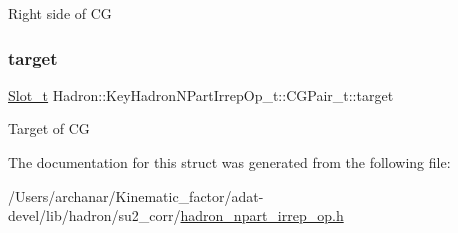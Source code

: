 Right side of CG \mbox{\label{structHadron_1_1KeyHadronNPartIrrepOp__t_1_1CGPair__t_aeb67dd901fec46892d25ddf2237eaa7d}} 
\subsubsection{\texorpdfstring{target}{target}}
{\footnotesize\ttfamily \mbox{\hyperlink{structHadron_1_1KeyHadronNPartIrrepOp__t_1_1CGPair__t_1_1Slot__t}{Slot\+\_\+t}} Hadron\+::\+Key\+Hadron\+N\+Part\+Irrep\+Op\+\_\+t\+::\+C\+G\+Pair\+\_\+t\+::target}

Target of CG 

The documentation for this struct was generated from the following file\+:\begin{DoxyCompactItemize}
\item 
/\+Users/archanar/\+Kinematic\+\_\+factor/adat-\/devel/lib/hadron/su2\+\_\+corr/\mbox{\hyperlink{adat-devel_2lib_2hadron_2su2__corr_2hadron__npart__irrep__op_8h}{hadron\+\_\+npart\+\_\+irrep\+\_\+op.\+h}}\end{DoxyCompactItemize}
